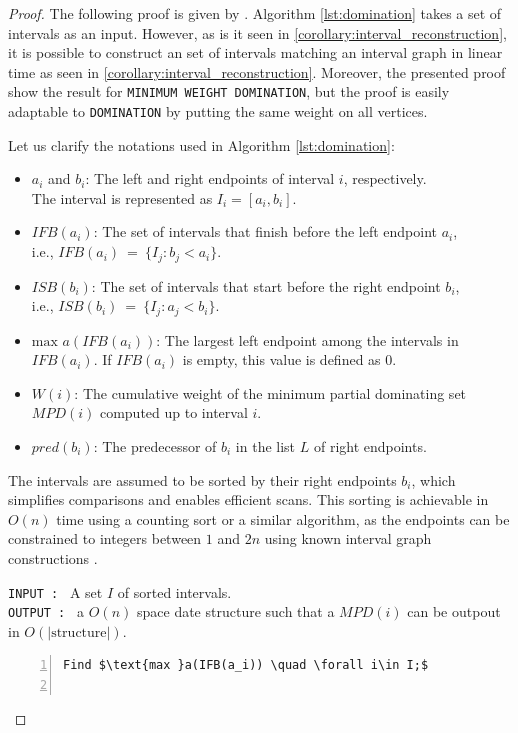 \documentclass{article}
\begin{document}
\begin{proof}\label{proof:domination}
    The following proof is given by \cite{chang}.
    Algorithm \ref{lst:domination} takes a set of intervals as an input.
    However, as is it seen in \cref{corollary:interval_reconstruction}, it is possible to construct an set of intervals matching an interval graph in linear time as seen in \cref{corollary:interval_reconstruction}.
    Moreover, the presented proof show the result for \texttt{MINIMUM WEIGHT DOMINATION}, 
    but the proof is easily adaptable to \texttt{DOMINATION} by putting the same weight on all vertices.

    \bigskip

    \bigskip

    Let us clarify the notations used in Algorithm \ref{lst:domination}:
    \begin{itemize}
        \item $a_i$ and $b_i$: The left and right endpoints of interval $i$, respectively. \\ 
        The interval is represented as $I_i = [a_i, b_i]$.
        \item $IFB(a_i)$: The set of intervals that finish before the left endpoint $a_i$, \\ i.e., $IFB(a_i)~=~\{I_j : b_j < a_i\}$.
        \item $ISB(b_i)$: The set of intervals that start before the right endpoint $b_i$, \\ i.e., $ISB(b_i)~=~\{I_j : a_j < b_i\}$.
        \item $\text{max } a(IFB(a_i))$: The largest left endpoint among the intervals in $IFB(a_i)$. If $IFB(a_i)$ is empty, this value is defined as $0$.
        \item $W(i)$: The cumulative weight of the minimum partial dominating set $MPD(i)$ computed up to interval $i$.
        \item $pred(b_i)$: The predecessor of $b_i$ in the list $L$ of right endpoints.
    \end{itemize}

    The intervals are assumed to be sorted by their right endpoints $b_i$, which simplifies comparisons and enables efficient scans. 
    This sorting is achievable in $O(n)$ time using a counting sort or a similar algorithm, as the endpoints can be constrained to integers between $1$ and $2n$ using known interval graph constructions \cite{chang}.

    \bigskip

    \noindent\texttt{INPUT : } A set $I$ of sorted intervals. \\
    \texttt{OUTPUT : } a $O(n)$ space date structure such that a $MPD(i)$ can be outpout in $O(|\text{structure}|).$ 
    \begin{lstlisting}[mathescape=true, caption={Dominating set algorithm}, label={lst:domination}, frame=single, numbers=left]
        Find $\text{max }a(IFB(a_i)) \quad \forall i\in I;$
        

\end{lstlisting}
\end{proof}
\end{document}
